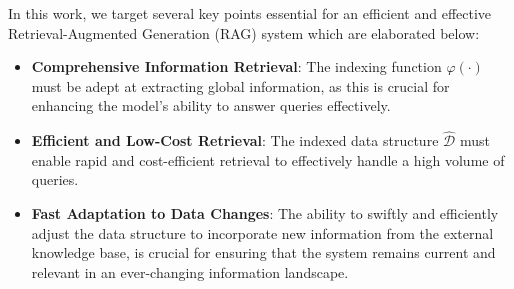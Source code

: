 \documentclass{article} %
\def\model{LightRAG}
\begin{document}


In this work, we target several key points essential for an efficient and effective Retrieval-Augmented Generation (RAG) system which are elaborated below:\vspace{-0.05in}
\begin{itemize}[leftmargin=*]

\item \textbf{Comprehensive Information Retrieval}: The indexing function $\varphi(\cdot)$ must be adept at extracting global information, as this is crucial for enhancing the model's ability to answer queries effectively.

\item \textbf{Efficient and Low-Cost Retrieval}: The indexed data structure $\hat{\mathcal{D}}$ must enable rapid and cost-efficient retrieval to effectively handle a high volume of queries.

\item \textbf{Fast Adaptation to Data Changes}: The ability to swiftly and efficiently adjust the data structure to incorporate new information from the external knowledge base, is crucial for ensuring that the system remains current and relevant in an ever-changing information landscape.

\end{itemize}

\end{document}
